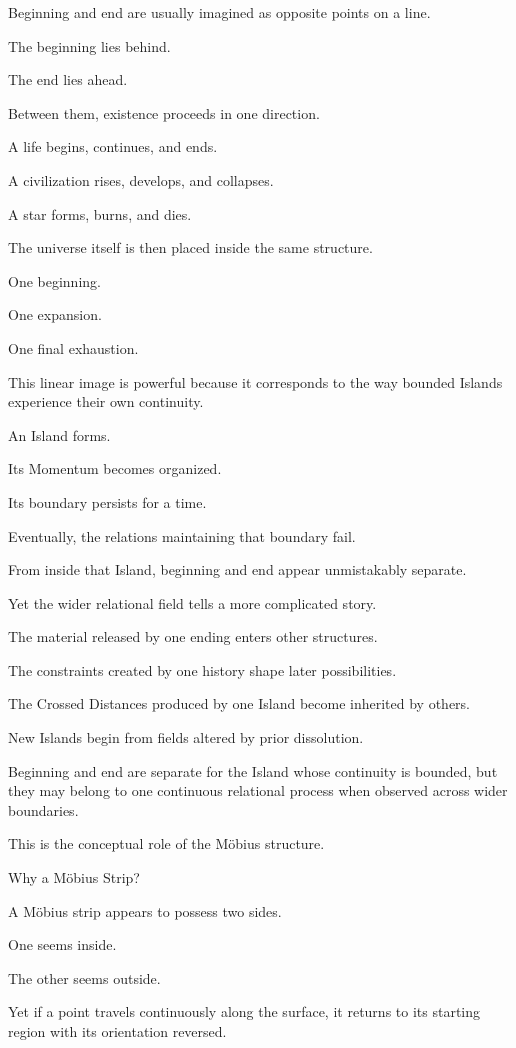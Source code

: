 Beginning and end are usually imagined as opposite points on a line.

The beginning lies behind.

The end lies ahead.

Between them, existence proceeds in one direction.

A life begins, continues, and ends.

A civilization rises, develops, and collapses.

A star forms, burns, and dies.

The universe itself is then placed inside the same structure.

One beginning.

One expansion.

One final exhaustion.

This linear image is powerful because it corresponds to the way bounded Islands experience their own continuity.

An Island forms.

Its Momentum becomes organized.

Its boundary persists for a time.

Eventually, the relations maintaining that boundary fail.

From inside that Island, beginning and end appear unmistakably separate.

Yet the wider relational field tells a more complicated story.

The material released by one ending enters other structures.

The constraints created by one history shape later possibilities.

The Crossed Distances produced by one Island become inherited by others.

New Islands begin from fields altered by prior dissolution.

Beginning and end are separate for the Island whose continuity is bounded, but they may belong to one continuous relational process when observed across wider boundaries.

This is the conceptual role of the Möbius structure.

Why a Möbius Strip?

A Möbius strip appears to possess two sides.

One seems inside.

The other seems outside.

Yet if a point travels continuously along the surface, it returns to its starting region with its orientation reversed.

